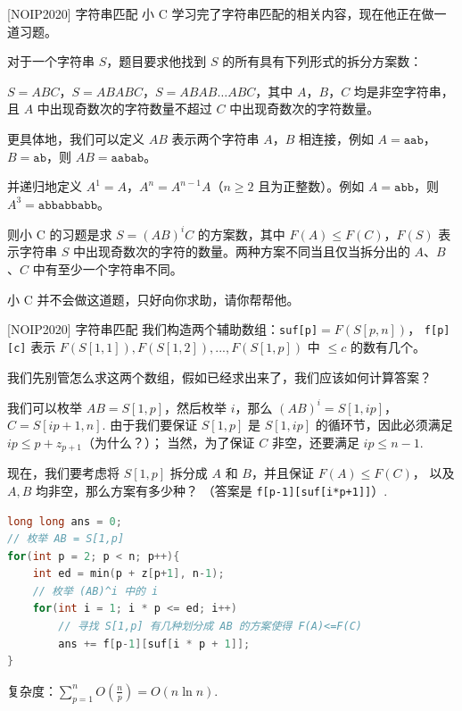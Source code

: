 \documentclass{beamer}
\begin{document}
\begin{frame}[fragile]{[NOIP2020] 字符串匹配}
    \footnotesize
    小 C 学习完了字符串匹配的相关内容，现在他正在做一道习题。

    \vspace{.5em}
    对于一个字符串 $S$，题目要求他找到 $S$ 的所有具有下列形式的拆分方案数：

    \vspace{.5em}
    $S = ABC$，$S = ABABC$，$S = ABAB \ldots ABC$，其中 $A$，$B$，$C$ 均是非空字符串，且 $A$ 中出现奇数次的字符数量不超过 $C$ 中出现奇数次的字符数量。

    \vspace{.5em}
    更具体地，我们可以定义 $AB$ 表示两个字符串 $A$，$B$ 相连接，例如 $A = \texttt{aab}$，$B = \texttt{ab}$，则 $AB = \texttt{aabab}$。

    \vspace{.5em}
    并递归地定义 $A^1=A$，$A^n = A^{n - 1} A$（$n \ge 2$ 且为正整数）。例如 $A = \texttt{abb}$，则 $A^3=\texttt{abbabbabb}$。

    \vspace{.5em}
    则小 C 的习题是求 $S = {(AB)}^iC$ 的方案数，其中 $F(A) \le F(C)$，$F(S)$ 表示字符串 $S$ 中出现奇数次的字符的数量。两种方案不同当且仅当拆分出的 $A$、$B$、$C$ 中有至少一个字符串不同。

    \vspace{.5em}
    小 C 并不会做这道题，只好向你求助，请你帮帮他。
\end{frame}

\begin{frame}[fragile]{[NOIP2020] 字符串匹配}
    \footnotesize
    我们构造两个辅助数组：\verb|suf[p]|$=F(S[p,n])$，
    \verb|f[p][c]| 表示 $F(S[1,1]),F(S[1,2]),...,F(S[1,p])$ 中 $\leq c$ 的数有几个。

    \vspace{.5em}
    我们先别管怎么求这两个数组，假如已经求出来了，我们应该如何计算答案？

    \vspace{.5em}\pause
    我们可以枚举 $AB=S[1,p]$，然后枚举 $i$，那么 $(AB)^i=S[1,ip]$，$C=S[ip+1,n]$.
    由于我们要保证 $S[1,p]$ 是 $S[1,ip]$ 的循环节，因此必须满足 $ip\leq p+z_{p+1}$（为什么？）；
    当然，为了保证 $C$ 非空，还要满足 $ip\leq n-1$.

    \vspace{.5em}\pause
    现在，我们要考虑将 $S[1,p]$ 拆分成 $A$ 和 $B$，并且保证 $F(A)\leq F(C)$，
    以及 $A,B$ 均非空，那么方案有多少种？
    \pause（答案是 \verb|f[p-1][suf[i*p+1]]|）.

    \pause
    \begin{lstlisting}[language=c++]
long long ans = 0;
// 枚举 AB = S[1,p]
for(int p = 2; p < n; p++){
    int ed = min(p + z[p+1], n-1);
    // 枚举 (AB)^i 中的 i
    for(int i = 1; i * p <= ed; i++)
        // 寻找 S[1,p] 有几种划分成 AB 的方案使得 F(A)<=F(C)
        ans += f[p-1][suf[i * p + 1]];
}
    \end{lstlisting}
    复杂度：$\sum_{p=1}^n O(\frac{n}{p})=O(n\ln n)$.
\end{frame}
\end{document}
